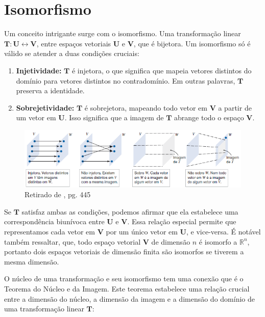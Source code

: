\section{Isomorfismo}
Um conceito intrigante surge com o isomorfismo. Uma transformação linear $\mathbf{T}: \mathbf{U} \longleftrightarrow \mathbf{V}$, entre espaços vetoriais $\mathbf{U}$ e $\mathbf{V}$, que é bijetora. Um isomorfismo só é válido se atender a duas condições cruciais:

\begin{enumerate}
	\item \textbf{Injetividade:} $\mathbf{T}$ é injetora, o que significa que mapeia vetores distintos do domínio para vetores distintos no contradomínio. Em outras palavras, $\mathbf{T}$ preserva a identidade.
	\item \textbf{Sobrejetividade:} $\mathbf{T}$ é sobrejetora, mapeando todo vetor em $\mathbf{V}$ a partir de um vetor em $\mathbf{U}$. Isso significa que a imagem de $\mathbf{T}$ abrange todo o espaço $\mathbf{V}$.
\end{enumerate}

\begin{figure}[H]
	\centering
	\includegraphics[scale=0.90]{t_isomorfismo.png}
	\caption{Retirado de \cite{anton2010elementary}, pg. 445}
\end{figure}

Se $\mathbf{T}$ satisfaz ambas as condições, podemos afirmar que ela estabelece uma correspondência biunívoca entre $\mathbf{U}$ e $\mathbf{V}$. Essa relação especial permite que representamos cada vetor em $\mathbf{V}$  por um único vetor em $\mathbf{U}$, e vice-versa. É notável também ressaltar, que, todo espaço vetorial $\mathbf{V}$ de dimensão $n$ é isomorfo a $\mathbb{R}^n$, portanto dois espaços vetoriais de dimensão finita são isomorfos se tiverem a mesma dimensão.

O núcleo de uma transformação e seu isomorfismo tem uma conexão que é o Teorema do Núcleo e da Imagem. Este teorema estabelece uma relação crucial entre a dimensão do núcleo, a dimensão da imagem e a dimensão do domínio de uma transformação linear $\mathbf{T}$:

